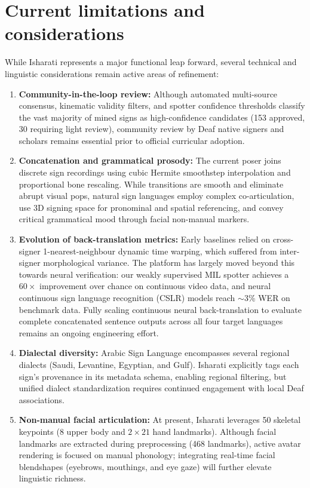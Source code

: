 \section{Current limitations and considerations}
While Isharati represents a major functional leap forward, several technical and linguistic considerations remain active areas of refinement:
\begin{enumerate}[leftmargin=*,itemsep=2pt]
  \item \textbf{Community-in-the-loop review:} Although automated multi-source consensus, kinematic validity filters, and spotter confidence thresholds classify the vast majority of mined signs as high-confidence candidates (153 approved, 30 requiring light review), community review by Deaf native signers and scholars remains essential prior to official curricular adoption.
  \item \textbf{Concatenation and grammatical prosody:} The current poser joins discrete sign recordings using cubic Hermite smoothstep interpolation and proportional bone rescaling. While transitions are smooth and eliminate abrupt visual pops, natural sign languages employ complex co-articulation, use 3D signing space for pronominal and spatial referencing, and convey critical grammatical mood through facial non-manual markers.
  \item \textbf{Evolution of back-translation metrics:} Early baselines relied on cross-signer 1-nearest-neighbour dynamic time warping, which suffered from inter-signer morphological variance. The platform has largely moved beyond this towards neural verification: our weakly supervised MIL spotter achieves a $60\times$ improvement over chance on continuous video data, and neural continuous sign language recognition (CSLR) models reach $\sim$3\% WER on benchmark data. Fully scaling continuous neural back-translation to evaluate complete concatenated sentence outputs across all four target languages remains an ongoing engineering effort.
  \item \textbf{Dialectal diversity:} Arabic Sign Language encompasses several regional dialects (Saudi, Levantine, Egyptian, and Gulf). Isharati explicitly tags each sign's provenance in its metadata schema, enabling regional filtering, but unified dialect standardization requires continued engagement with local Deaf associations.
  \item \textbf{Non-manual facial articulation:} At present, Isharati leverages 50 skeletal keypoints (8 upper body and $2 \times 21$ hand landmarks). Although facial landmarks are extracted during preprocessing (468 landmarks), active avatar rendering is focused on manual phonology; integrating real-time facial blendshapes (eyebrows, mouthings, and eye gaze) will further elevate linguistic richness.
\end{enumerate}

